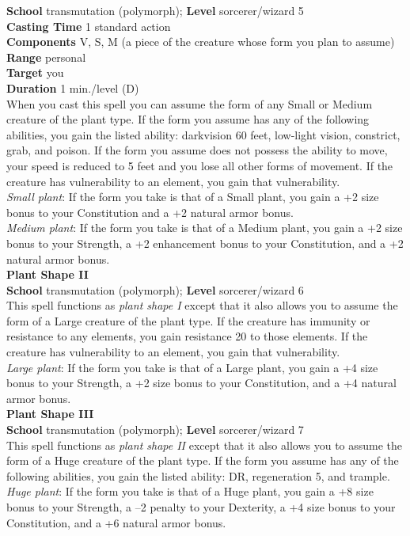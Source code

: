 \textbf{School }transmutation (polymorph); \textbf{Level }sorcerer/wizard 5\\
\textbf{Casting Time }1 standard action\\
\textbf{Components }V, S, M (a piece of the creature whose form you plan to assume)\\
\textbf{Range }personal\\
\textbf{Target }you\\
\textbf{Duration }1 min./level (D)\\
When you cast this spell you can assume the form of any Small or Medium creature of the plant type. If the form you assume has any of the following abilities, you gain the listed ability: darkvision 60 feet, low-light vision, constrict, grab, and poison. If the form you assume does not possess the ability to move, your speed is reduced to 5 feet and you lose all other forms of movement. If the creature has vulnerability to an element, you gain that vulnerability.\\
\textit{Small plant}: If the form you take is that of a Small plant, you gain a +2 size bonus to your Constitution and a +2 natural armor bonus.\\
\textit{Medium plant}: If the form you take is that of a Medium plant, you gain a +2 size bonus to your Strength, a +2 enhancement bonus to your Constitution, and a +2 natural armor bonus.\\
\textbf{Plant Shape II}\\
\textbf{School }transmutation (polymorph); \textbf{Level }sorcerer/wizard 6\\
This spell functions as \textit{plant shape I} except that it also allows you to assume the form of a Large creature of the plant type. If the creature has immunity or resistance to any elements, you gain resistance 20 to those elements. If the creature has vulnerability to an element, you gain that vulnerability.\\
\textit{Large plant}: If the form you take is that of a Large plant, you gain a +4 size bonus to your Strength, a +2 size bonus to your Constitution, and a +4 natural armor bonus.\\
\textbf{Plant Shape III}\\
\textbf{School }transmutation (polymorph); \textbf{Level }sorcerer/wizard 7\\
This spell functions as \textit{plant shape II} except that it also allows you to assume the form of a Huge creature of the plant type. If the form you assume has any of the following abilities, you gain the listed ability: DR, regeneration 5, and trample. \\
\textit{Huge plant}: If the form you take is that of a Huge plant, you gain a +8 size bonus to your Strength, a –2 penalty to your Dexterity, a +4 size bonus to your Constitution, and a +6 natural armor bonus.\\
